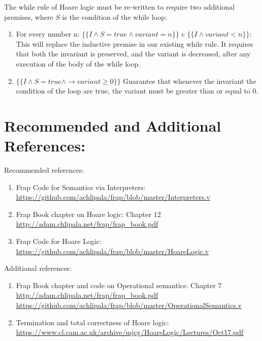 \documentclass{article}
\begin{document}
The while rule of Hoare logic must be re-written to require two additional premises, where $S$ is the condition of the while loop: \begin{enumerate}
    \item For every number n:  $\{\{ I \wedge S = \textit{true} \wedge \textit{variant}=n\}\}$ c $\{\{I \wedge \textit{variant}<n\}\}$:\\
        This will replace the inductive premise in our existing while rule.
        It requires that both the invariant is preserved, and the variant is decreased, after any execution of the body of the while loop.
    \item $\{\{I \wedge S = \textit{true} \wedge \rightarrow \textit{variant} \geq 0\}\}$
        Guarantee that whenever the invariant the condition of the loop are true, the variant must be greater than or equal to 0.
\end{enumerate}

\section{Recommended and Additional References:}
Recommended references: \begin{enumerate}
    \item Frap Code for Semantics via Interpreters:
    \href{https://github.com/achlipala/frap/blob/master/Interpreters.v}{https://github.com/achlipala/frap/blob/master/Interpreters.v}\\
    \item Frap Book chapter on Hoare logic: Chapter 12 \\
    \href{http://adam.chlipala.net/frap/frap\_book.pdf}{http://adam.chlipala.net/frap/frap\_book.pdf}
    \item Frap Code for Hoare Logic: \\
    \href{https://github.com/achlipala/frap/blob/master/HoareLogic.v}{https://github.com/achlipala/frap/blob/master/HoareLogic.v}
\end{enumerate}

Additional references: \begin{enumerate}
    \item Frap Book chapter and code on Operational semantics: Chapter 7\\
    \href{http://adam.chlipala.net/frap/frap\_book.pdf}{http://adam.chlipala.net/frap/frap\_book.pdf}\\
    \href{https://github.com/achlipala/frap/blob/master/OperationalSemantics.v}{https://github.com/achlipala/frap/blob/master/OperationalSemantics.v}
    \item Termination and total correctness of Hoare logic:\\
    \href{https://www.cl.cam.ac.uk/archive/mjcg/HoareLogic/Lectures/Oct17.pdf}{https://www.cl.cam.ac.uk/archive/mjcg/HoareLogic/Lectures/Oct17.pdf}
\end{enumerate}
\end{document}
